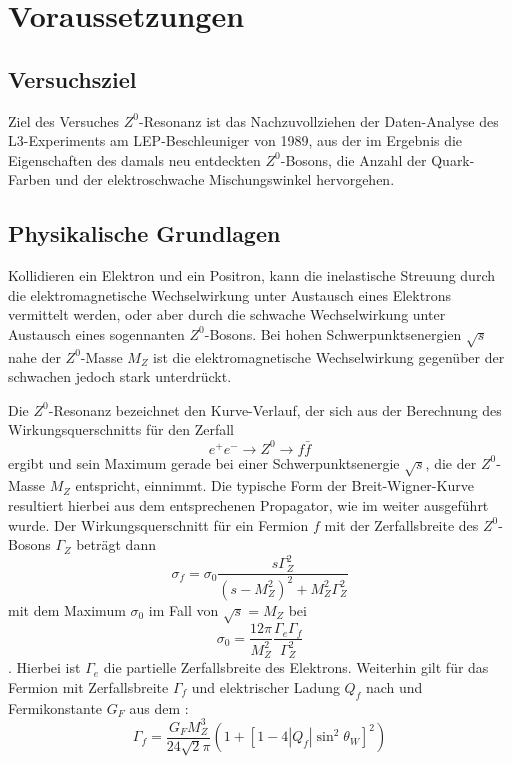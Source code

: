 \section{Voraussetzungen}

\subsection{Versuchsziel}

Ziel des Versuches $Z^0$-Resonanz ist das Nachzuvollziehen der Daten-Analyse des
L3-Experiments am LEP-Beschleuniger von 1989, aus der im Ergebnis die
Eigenschaften des damals neu entdeckten $Z^0$-Bosons, die Anzahl der
Quark-Farben und der elektroschwache Mischungswinkel hervorgehen.

\subsection{Physikalische Grundlagen}

Kollidieren ein Elektron und ein Positron, kann die inelastische Streuung durch
die elektromagnetische Wechselwirkung unter Austausch eines Elektrons vermittelt
werden, oder aber durch die schwache Wechselwirkung unter Austausch eines
sogennanten $Z^0$-Bosons. Bei hohen Schwerpunktsenergien $\sqrt{s}$ nahe der
$Z^0$-Masse $M_Z$ ist die elektromagnetische Wechselwirkung gegenüber der
schwachen jedoch stark unterdrückt.

Die $Z^0$-Resonanz bezeichnet den Kurve-Verlauf, der sich aus der
Berechnung des Wirkungsquerschnitts für den Zerfall
\begin{equation}
  e^{+} e^{-} \rightarrow Z^0 \rightarrow f \bar{f}
\end{equation}
ergibt und sein Maximum gerade bei einer Schwerpunktsenergie
$\sqrt{s}$, die der $Z^0$-Masse $M_Z$ entspricht, einnimmt. Die typische Form
der Breit-Wigner-Kurve resultiert hierbei aus dem entsprechenen Propagator,
wie im \cite[Gl. 2]{script} weiter ausgeführt wurde. Der Wirkungsquerschnitt für
ein Fermion $f$ mit der Zerfallsbreite des $Z^0$-Bosons $Γ_Z$ beträgt dann
\begin{equation}
  \label{eqn:sigmaf}
  σ_f = σ_0 \frac{s Γ_Z^2}{(s − M_Z^2)^2 + M_Z^2Γ_Z^2}
\end{equation}
mit dem Maximum $σ_0$ im Fall von $\sqrt{s} = M_Z$ bei
\begin{equation}
  σ_0 = \frac{12π}{M_Z^2}\frac{Γ_eΓ_f}{Γ_Z^2}
\end{equation}
. Hierbei ist $Γ_e$ die partielle Zerfallsbreite des Elektrons. Weiterhin gilt
für das Fermion mit Zerfallsbreite $Γ_f$ und elektrischer Ladung $Q_f$ nach
\cite[Gl. 6]{script} und Fermikonstante $G_F$ aus dem \cite{pdb}:
\begin{equation}
  Γ_f = \frac{G_F M_Z^3}{24 \sqrt{2}π}\left(1+[1−4|Q_f|\sin^2θ_W]^2\right)
\end{equation}

